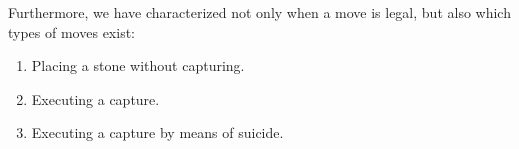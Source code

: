 Furthermore, we have characterized not only when a move is legal, but also which types of moves exist:
\begin{enumerate}
	\item Placing a stone without capturing.
	\item Executing a capture.
	\item Executing a capture by means of suicide.
\end{enumerate}

%		
%		
%		
